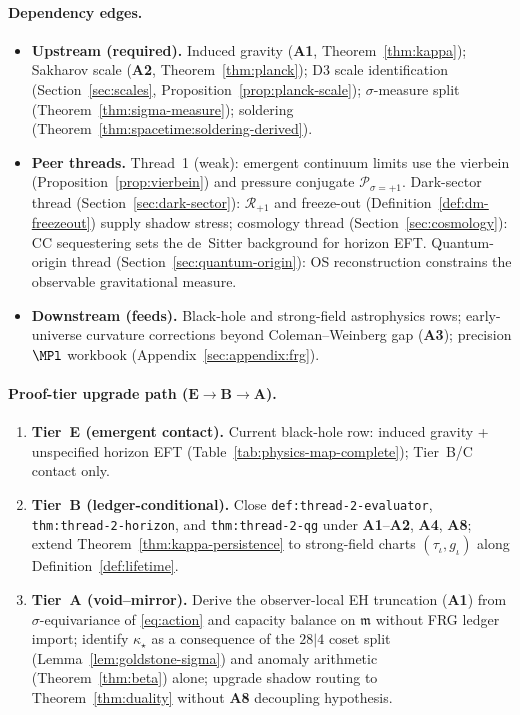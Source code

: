 \paragraph{Dependency edges.}
\begin{itemize}[leftmargin=*]
  \item \textbf{Upstream (required).}
    Induced gravity (\textbf{A1}, Theorem~\ref{thm:kappa});
    Sakharov scale (\textbf{A2}, Theorem~\ref{thm:planck});
    D3 scale identification (Section~\ref{sec:scales},
    Proposition~\ref{prop:planck-scale});
    $\sigma$-measure split (Theorem~\ref{thm:sigma-measure});
    soldering (Theorem~\ref{thm:spacetime:soldering-derived}).
  \item \textbf{Peer threads.}
    Thread~1 (weak): emergent continuum limits use the vierbein
    (Proposition~\ref{prop:vierbein}) and pressure conjugate
    $\mathcal{P}_{\sigma=+1}$.
    Dark-sector thread (Section~\ref{sec:dark-sector}): $\mathcal{R}_{+1}$
    and freeze-out (Definition~\ref{def:dm-freezeout}) supply shadow
    stress; cosmology thread (Section~\ref{sec:cosmology}): CC sequestering
    sets the de~Sitter background for horizon EFT.
    Quantum-origin thread (Section~\ref{sec:quantum-origin}): OS reconstruction
    constrains the observable gravitational measure.
  \item \textbf{Downstream (feeds).}
    Black-hole and strong-field astrophysics rows;
    early-universe curvature corrections beyond
    Coleman--Weinberg gap (\textbf{A3});
    precision $\MPl$ workbook (Appendix~\ref{sec:appendix:frg}).
\end{itemize}

\paragraph{Proof-tier upgrade path ($\mathbf{E}\to\mathbf{B}\to\mathbf{A}$).}
\begin{enumerate}[label=\textbf{\arabic*.},leftmargin=*]
  \item \textbf{Tier~E (emergent contact).}
    Current black-hole row: induced gravity + unspecified horizon EFT
    (Table~\ref{tab:physics-map-complete}); Tier~B/C contact only.
  \item \textbf{Tier~B (ledger-conditional).}
    Close \texttt{def:thread-2-evaluator},
    \texttt{thm:thread-2-horizon}, and
    \texttt{thm:thread-2-qg} under \textbf{A1}--\textbf{A2},
    \textbf{A4}, \textbf{A8}; extend Theorem~\ref{thm:kappa-persistence}
    to strong-field charts $(\tau_\iota,g_\iota)$ along
    Definition~\ref{def:lifetime}.
  \item \textbf{Tier~A (void--mirror).}
    Derive the observer-local EH truncation (\textbf{A1}) from
    $\sigma$-equivariance of \eqref{eq:action} and capacity balance on
    $\mathfrak{m}$ without FRG ledger import; identify
    $\kappa_\star$ as a consequence of the $28|4$ coset split
    (Lemma~\ref{lem:goldstone-sigma}) and anomaly arithmetic
    (Theorem~\ref{thm:beta}) alone; upgrade shadow routing to
    Theorem~\ref{thm:duality} without \textbf{A8} decoupling hypothesis.
\end{enumerate}

